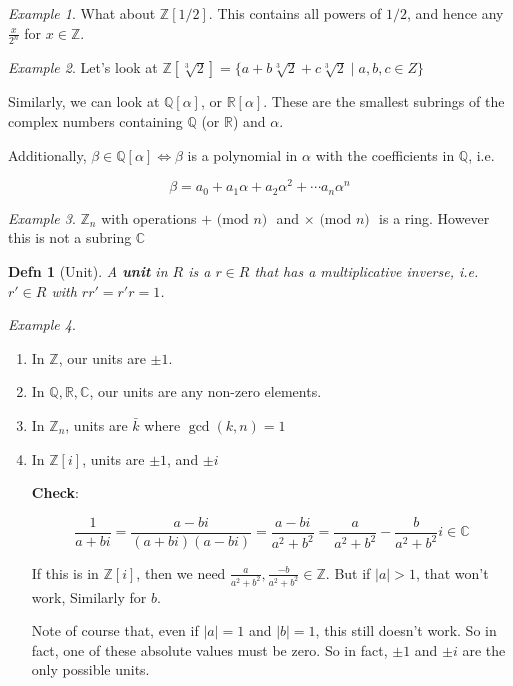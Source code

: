 \documentclass[12pt]{article}
\def\Z{{\mathbb Z}}
\def\Q{{\mathbb Q}}
\def\R{{\mathbb R}}
\def\C{{\mathbb C}}
\renewcommand{\mod}[1]{\text{ (mod $#1$) }}
\newtheorem{definition}{Defn}
\theoremstyle{remark}
\theoremstyle{remark}
\theoremstyle{remark}
\newtheorem{example}{Example}
\theoremstyle{remark}
\theoremstyle{remark}
\begin{document}
\begin{example}
  What about $\Z[1/2]$. This contains all powers of $1/2$, and hence any
  $\frac{x}{2^n}$ for $x \in \Z$.
\end{example}

\begin{example}
  Let's look at $\Z[\sqrt[3]{2}] = \{a + b \sqrt[3]{2} + c \sqrt[3]{2} \mid a,
  b, c \in Z \}$
\end{example}

Similarly, we can look at $\Q[\alpha]$, or $\R[\alpha]$. These are the smallest
subrings of the complex numbers containing $\Q$ (or $\R$) and $\alpha$.

Additionally, $\beta \in \Q[\alpha] \Leftrightarrow \beta$ is a polynomial in
$\alpha$ with the coefficients in $\Q$, i.e.

\[
  \beta = a_0 + a_1 \alpha + a_2 \alpha^2 + \cdots a_n \alpha^n
\]

\begin{example}
  $\Z_n$ with operations $+ \mod n$ and $\times \mod n$ is a ring. However this
  is not a subring $\C$
\end{example}

\begin{definition}[Unit]
  A {\bf unit} in $R$ is a $r \in R$ that has a multiplicative inverse, i.e. $r'
  \in R$ with $rr' = r'r = 1$.
\end{definition}

\begin{example}
  \begin{enumerate}
    \item In $\Z$, our units are $\pm 1$.
    \item In $\Q, \R, \C$, our units are any non-zero elements.
    \item In $\Z_n$, units are $\bar k$ where $\gcd(k, n) = 1$
    \item In $\Z[i]$, units are $\pm 1$, and $\pm i$

      {\bf Check}:

      \[
        \frac{1}{a + bi} = \frac{a - bi}{(a + bi)(a - bi)} = \frac{a - bi}{a^2 +
        b^2} = \frac{a}{a^2 + b^2} - \frac{b}{a^2 + b^2}i \in \C
      \]

      If this is in $\Z[i]$, then we need $\frac{a}{a^2 + b^2}, \frac{-b}{a^2 +
      b^2} \in \Z$. But if $|a| > 1$, that won't work, Similarly for $b$.

      Note of course that, even if $|a| = 1$ and $|b| = 1$, this still doesn't
      work. So in fact, one of these absolute values must be zero. So in fact,
      $\pm 1$ and $\pm i$ are the only possible units.
  \end{enumerate}
\end{example}
\end{document}
